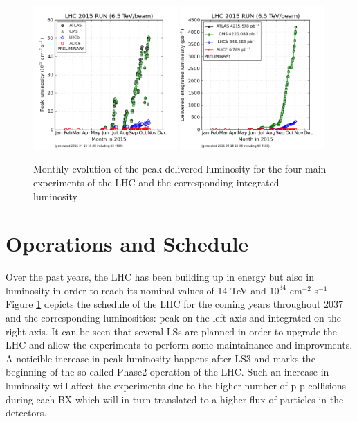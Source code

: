 		\begin{figure}[h!]
			\centering
			\includegraphics[width=0.49\textwidth]{img/I-2-LHC/luminosity-peak.png}
			\includegraphics[width=0.49\textwidth]{img/I-2-LHC/luminosity-integrated.png}
			\caption{Monthly evolution of the peak delivered luminosity for the four main experiments of the LHC and the corresponding integrated luminosity \cite{LUMI-PP-LPC}.}
			\label{fig:I-2-luminosity}
		\end{figure}

	\section{Operations and Schedule}

    Over the past years, the LHC has been building up in energy but also in luminosity in order to reach its nominal values of 14 TeV and $ 10^{34} $ cm$^{-2}$ s$^{-1}$. Figure \ref{fig:I-2-luminosity} depicts the schedule of the LHC for the coming years throughout 2037 and the corresponding luminosities: peak on the left axis and integrated on the right axis. It can be seen that several LSs are planned in order to upgrade the LHC and allow the experiments to perform some maintainance and improvments. A noticible increase in peak luminosity happens after LS3 and marks the beginning of the so-called Phase2 operation of the LHC. Such an increase in luminosity will affect the experiments due to the higher number of p-p collisions during each BX which will in turn translated to a higher flux of particles in the detectors. \\

